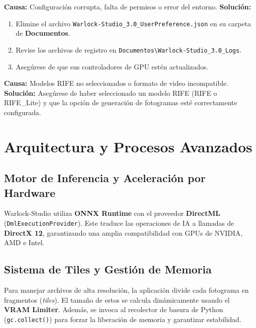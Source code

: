 \documentclass[11pt, a4paper]{article}
\newcommand{\inlinecode}[1]{\colorbox{WarlockLightGray}{\small\texttt{#1}}}
\begin{document}
\begin{description}[leftmargin=*, style=nextline, itemsep=0.8em]
    \item[\faQuestionCircle\ Problema: La aplicación no se abre]
        \textbf{Causa:} Configuración corrupta, falta de permisos o error del entorno.
        \textbf{Solución:}
        \begin{enumerate}[nosep, leftmargin=*]
            \item Elimine el archivo \inlinecode{Warlock-Studio_3.0_UserPreference.json} en su carpeta de \textbf{Documentos}.
            \item Revise los archivos de registro en \texttt{Documentos\textbackslash Warlock-Studio_3.0_Logs}.
            \item Asegúrese de que sus controladores de GPU estén actualizados.
        \end{enumerate}

    \item[\faExclamationTriangle\ Problema: La interpolación de fotogramas no funciona]
        \textbf{Causa:} Modelos RIFE no seleccionados o formato de video incompatible.
        \textbf{Solución:} Asegúrese de haber seleccionado un modelo RIFE (RIFE o RIFE\_Lite) y que la opción de generación de fotogramas esté correctamente configurada.
\end{description}

\section{Arquitectura y Procesos Avanzados}

\subsection{Motor de Inferencia y Aceleración por Hardware}
Warlock-Studio utiliza \textbf{ONNX Runtime} con el proveedor \textbf{DirectML} (\inlinecode{DmlExecutionProvider}). Este traduce las operaciones de IA a llamadas de \textbf{DirectX 12}, garantizando una amplia compatibilidad con GPUs de NVIDIA, AMD e Intel.

\subsection{Sistema de Tiles y Gestión de Memoria}
Para manejar archivos de alta resolución, la aplicación divide cada fotograma en fragmentos (\textit{tiles}). El tamaño de estos se calcula dinámicamente usando el \textbf{VRAM Limiter}. Además, se invoca al recolector de basura de Python (\inlinecode{gc.collect()}) para forzar la liberación de memoria y garantizar estabilidad.
\end{document}
